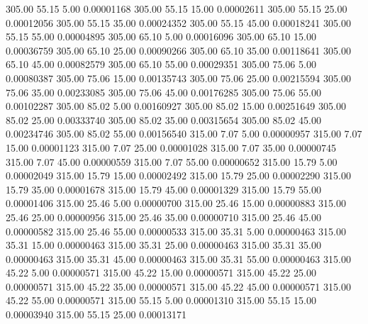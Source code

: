     305.00     55.15      5.00     0.00001168
    305.00     55.15     15.00     0.00002611
    305.00     55.15     25.00     0.00012056
    305.00     55.15     35.00     0.00024352
    305.00     55.15     45.00     0.00018241
    305.00     55.15     55.00     0.00004895
    305.00     65.10      5.00     0.00016096
    305.00     65.10     15.00     0.00036759
    305.00     65.10     25.00     0.00090266
    305.00     65.10     35.00     0.00118641
    305.00     65.10     45.00     0.00082579
    305.00     65.10     55.00     0.00029351
    305.00     75.06      5.00     0.00080387
    305.00     75.06     15.00     0.00135743
    305.00     75.06     25.00     0.00215594
    305.00     75.06     35.00     0.00233085
    305.00     75.06     45.00     0.00176285
    305.00     75.06     55.00     0.00102287
    305.00     85.02      5.00     0.00160927
    305.00     85.02     15.00     0.00251649
    305.00     85.02     25.00     0.00333740
    305.00     85.02     35.00     0.00315654
    305.00     85.02     45.00     0.00234746
    305.00     85.02     55.00     0.00156540
    315.00      7.07      5.00     0.00000957
    315.00      7.07     15.00     0.00001123
    315.00      7.07     25.00     0.00001028
    315.00      7.07     35.00     0.00000745
    315.00      7.07     45.00     0.00000559
    315.00      7.07     55.00     0.00000652
    315.00     15.79      5.00     0.00002049
    315.00     15.79     15.00     0.00002492
    315.00     15.79     25.00     0.00002290
    315.00     15.79     35.00     0.00001678
    315.00     15.79     45.00     0.00001329
    315.00     15.79     55.00     0.00001406
    315.00     25.46      5.00     0.00000700
    315.00     25.46     15.00     0.00000883
    315.00     25.46     25.00     0.00000956
    315.00     25.46     35.00     0.00000710
    315.00     25.46     45.00     0.00000582
    315.00     25.46     55.00     0.00000533
    315.00     35.31      5.00     0.00000463
    315.00     35.31     15.00     0.00000463
    315.00     35.31     25.00     0.00000463
    315.00     35.31     35.00     0.00000463
    315.00     35.31     45.00     0.00000463
    315.00     35.31     55.00     0.00000463
    315.00     45.22      5.00     0.00000571
    315.00     45.22     15.00     0.00000571
    315.00     45.22     25.00     0.00000571
    315.00     45.22     35.00     0.00000571
    315.00     45.22     45.00     0.00000571
    315.00     45.22     55.00     0.00000571
    315.00     55.15      5.00     0.00001310
    315.00     55.15     15.00     0.00003940
    315.00     55.15     25.00     0.00013171
